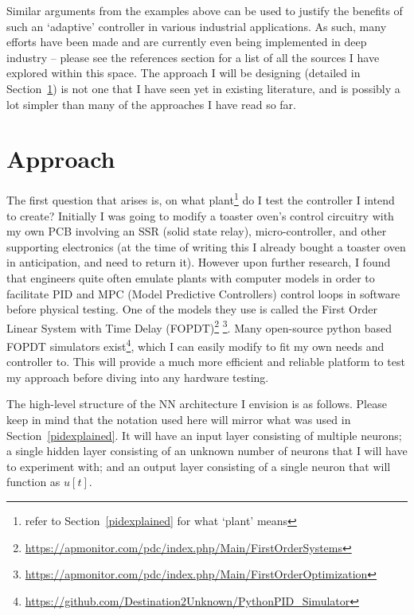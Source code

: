 \documentclass[10pt,twocolumn,letterpaper]{article}
\begin{document}
        Similar arguments from the examples above can be used to justify the benefits of such an `adaptive' controller
        in various industrial applications. As such, many efforts have been made and are currently even being
        implemented in deep industry -- please see the references section for a list of all the sources I have explored
        within this space. The approach I will be designing (detailed in Section~\ref{approach}) is not one that I have
        seen yet in existing literature, and is possibly a lot simpler than many of the approaches I have read so far.
        
    \section{Approach} \label{approach}

        The first question that arises is, on what plant\footnote{refer to Section~\ref{pidexplained} for what `plant'
        means} do I test the controller I intend to create? Initially I was going to modify a toaster oven's control
        circuitry with my own PCB involving an SSR (solid state relay), micro-controller, and other supporting
        electronics (at the time of writing this I already bought a toaster oven in anticipation, and need to return
        it). However upon further research, I found that engineers quite often emulate plants with computer models in
        order to facilitate PID and MPC (Model Predictive Controllers) control loops in software before physical
        testing. One of the models they use is called the First Order Linear System with Time Delay
        (FOPDT)\footnote{\url{https://apmonitor.com/pdc/index.php/Main/FirstOrderSystems}}
        \footnote{\url{https://apmonitor.com/pdc/index.php/Main/FirstOrderOptimization}}. Many open-source python based
        FOPDT simulators exist\footnote{\url{https://github.com/Destination2Unknown/PythonPID_Simulator}}, which I can
        easily modify to fit my own needs and controller to. This will provide a much more efficient and reliable
        platform to test my approach before diving into any hardware testing.

        The high-level structure of the NN architecture I envision is as follows. Please keep in mind that the notation
        used here will mirror what was used in Section~\ref{pidexplained}.  It will have an input layer consisting of
        multiple neurons; a single hidden layer consisting of an unknown number of neurons that I will have to
        experiment with; and an output layer consisting of a single neuron that will function as $u[t]$.
\end{document}
